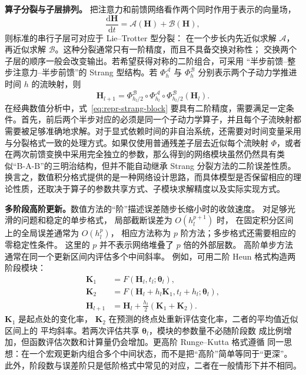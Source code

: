 \textbf{算子分裂与子层排列。}
把注意力和前馈网络看作两个同时作用于表示的向量场，
\[
    \frac{\mathrm{d}\boldsymbol{H}}{\mathrm{d}t}
    =
    \mathcal{A}(\boldsymbol{H})
    +
    \mathcal{B}(\boldsymbol{H}),
\]
则标准的串行子层可对应于 Lie--Trotter 型分裂：
在一个步长内先近似求解 \(\mathcal{A}\)，再近似求解
\(\mathcal{B}\)。这种分裂通常只有一阶精度，而且不具备交换对称性；
交换两个子层的顺序一般会改变输出。若希望获得对称的二阶组合，可采用
“半步前馈--整步注意力--半步前馈”的 Strang 型结构。若
\(\Phi_h^{\mathcal{A}}\) 与 \(\Phi_h^{\mathcal{B}}\)
分别表示两个子动力学推进时间 \(h\) 的流映射，则
\begin{equation}
    \boldsymbol{H}_{l+1}
    =
    \Phi_{h_l/2}^{\mathcal{B}}
    \circ
    \Phi_{h_l}^{\mathcal{A}}
    \circ
    \Phi_{h_l/2}^{\mathcal{B}}
    (\boldsymbol{H}_l).
    \label{eq:repr-strang-block}
\end{equation}
在经典数值分析中，式~\eqref{eq:repr-strang-block} 要具有二阶精度，需要满足一定条件。首先，前后两个半步对应的必须是同一个子动力学算子，并且每个子流映射都需要被足够准确地求解。对于显式依赖时间的非自治系统，还需要对时间变量采用与分裂格式一致的处理方式。如果仅使用普通残差子层去近似每个流映射 \(\Phi\)，或者在两次前馈变换中采用完全独立的参数，那么得到的网络模块虽然仍然具有类似“B-A-B”的三明治结构，但并不能自动继承 Strang 分裂方法的二阶误差性质。换言之，数值积分格式提供的是一种网络设计思路，而具体模型是否保留相应的理论性质，还取决于算子的参数共享方式、子模块求解精度以及实际实现方式。

\textbf{多阶段高阶更新。}数值方法的“阶”描述误差随步长缩小时的收敛速度。
对足够光滑的问题和稳定的单步格式，
局部截断误差为 \(O(h_l^{p+1})\) 时，
在固定积分区间上的全局误差通常为 \(O(h_l^p)\)，
相应方法称为 \(p\) 阶方法；多步格式还需要相应的零稳定性条件。
这里的 \(p\) 并不表示网络堆叠了 \(p\) 倍的外部层数。
高阶单步方法通常在同一个更新区间内评估多个中间斜率。
例如，可用二阶 Heun 格式构造两阶段模块：
\begin{align}
    \boldsymbol{K}_1
    &=
    F\!\left(
        \boldsymbol{H}_{l},t_l;
        \boldsymbol{\theta}_{l}
    \right),
    \nonumber\\
    \boldsymbol{K}_2
    &=
    F\!\left(
        \boldsymbol{H}_{l}+h_l\boldsymbol{K}_1,
        t_l+h_l;
        \boldsymbol{\theta}_{l}
    \right),
    \nonumber\\
    \boldsymbol{H}_{l+1}
    &=
    \boldsymbol{H}_{l}
    +
    \frac{h_l}{2}
    \left(
        \boldsymbol{K}_1+\boldsymbol{K}_2
    \right).
    \label{eq:repr-rk2-block}
\end{align}
\(\boldsymbol{K}_1\) 是起点处的变化率，
\(\boldsymbol{K}_2\) 在预测的终点处重新评估变化率，二者的平均值近似区间上的
平均斜率。若两次评估共享 \(\boldsymbol{\theta}_l\)，模块的参数量不必随阶段数
成比例增加，但函数评估次数和计算量仍会增加。更高阶 Runge--Kutta 格式遵循
同一思想：在一个宏观更新内组合多个中间状态，而不是把“高阶”简单等同于“更深”。
此外，阶段数与误差阶只是低阶格式中常见的对应，二者在一般情形下并不相同。

